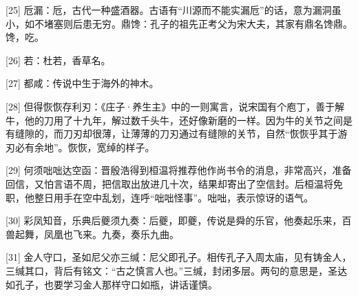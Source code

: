 \documentclass[12pt,UTF8]{ctexbook}
\begin{document}
[25] 卮漏：卮，古代一种盛酒器。古语有“川源而不能实漏卮”的话，意为漏洞虽小，如不堵塞则后患无穷。鼎馋：孔子的祖先正考父为宋大夫，其家有鼎名馋鼎。馋，吃。

[26] 若：杜若，香草名。

[27] 都咸：传说中生于海外的神木。

[28] 但得恢恢存利刃：《庄子·养生主》中的一则寓言，说宋国有个庖丁，善于解牛，他的刀用了十九年，解过数千头牛，还好像新磨的一样。因为牛的关节之间是有缝隙的，而刀刃却很薄，让薄薄的刀刃通过有缝隙的关节，自然“恢恢乎其于游刃必有余地”。恢恢，宽绰的样子。

[29] 何须咄咄达空函：晋殷浩得到桓温将推荐他作尚书令的消息，非常高兴，准备回信，又怕言语不周，把信取出放进几十次，结果却寄出了空信封。后桓温将免职，他整日用手在空中乱划，连呼“咄咄怪事”。咄咄，表示惊讶的语气。

[30] 彩凤知音，乐典后夔须九奏：后夔，即夔，传说是舜的乐官，他奏起乐来，百兽起舞，凤凰也飞来。九奏，奏乐九曲。

[31] 金人守口，圣如尼父亦三缄：尼父即孔子。相传孔子入周太庙，见有铸金人，三缄其口，背后有铭文：“古之慎言人也。”三缄，封闭多层。两句的意思是，圣达如孔子，也要学习金人那样守口如瓶，讲话谨慎。

\backmatter
\end{document}
